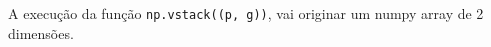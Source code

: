 \documentclass[12pt,varwidth=16cm,border=1pt]{standalone}
\begin{document}
A execução da função \verb+np.vstack((p, g))+, vai originar um numpy array de 2 dimensões.

\questiomfalse
\end{document}
